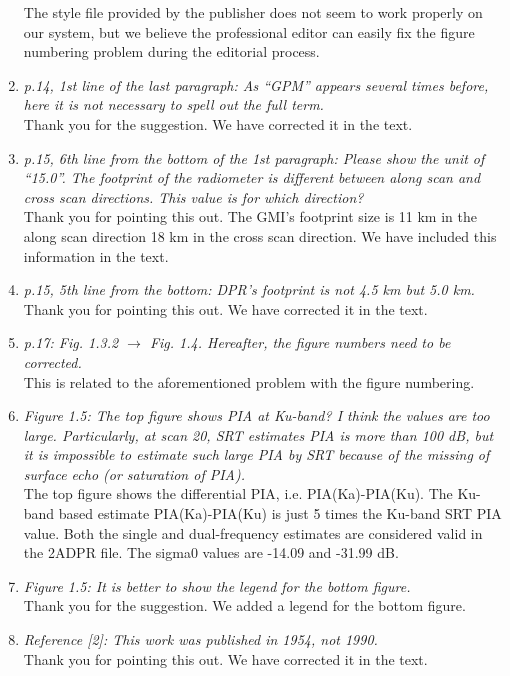 \documentclass[12pt]{article}
\begin{document}
\begin{enumerate}
{    The style file provided by the publisher does not seem to work properly on our system, but we believe the professional editor can easily fix the
    figure numbering problem during the editorial process.
    }
    \item{\textit{p.14, 1st line of the last paragraph: As “GPM” appears several times before, here it is not
    necessary to spell out the full term.}\\
    Thank you for the suggestion. We have corrected it in the text.
    }
    \item{\textit{p.15, 6th line from the bottom of the 1st paragraph: Please show the unit of “15.0”. The
    footprint of the radiometer is different between along scan and cross scan directions. This
    value is for which direction?}\\
    Thank you for pointing this out. The GMI's footprint size is 11 km in the along scan direction 18 km in the cross scan direction.
    We have included this information in the text.
    }
    \item{\textit{p.15, 5th line from the bottom: DPR’s footprint is not 4.5 km but 5.0 km.}\\
    Thank you for pointing this out.  We have corrected it in the text.
    }
    \item{\textit{p.17: Fig. 1.3.2 $\rightarrow$ Fig. 1.4. Hereafter, the figure numbers need to be corrected.}\\
    This is related to the aforementioned problem with the figure numbering.
    }
    \item{\textit{Figure 1.5: The top figure shows PIA at Ku-band? I think the values are too large. Particularly,
    at scan 20, SRT estimates PIA is more than 100 dB, but it is impossible to estimate such large
    PIA by SRT because of the missing of surface echo (or saturation of PIA).}\\
    The top figure shows the differential PIA, i.e. PIA(Ka)-PIA(Ku). The Ku-band based estimate PIA(Ka)-PIA(Ku) is just 5 
    times the Ku-band SRT PIA value.
    Both the single and dual-frequency estimates are considered valid in the 2ADPR file.  The sigma0 values are -14.09 and
    -31.99 dB.
    }
    \item{\textit{Figure 1.5: It is better to show the legend for the bottom figure.}\\
    Thank you for the suggestion. We added a legend for the bottom figure.
    }
    \item{\textit{Reference [2]: This work was published in 1954, not 1990.}\\
    Thank you for pointing this out.  We have corrected it in the text.
    }

\end{enumerate}
\end{document}
